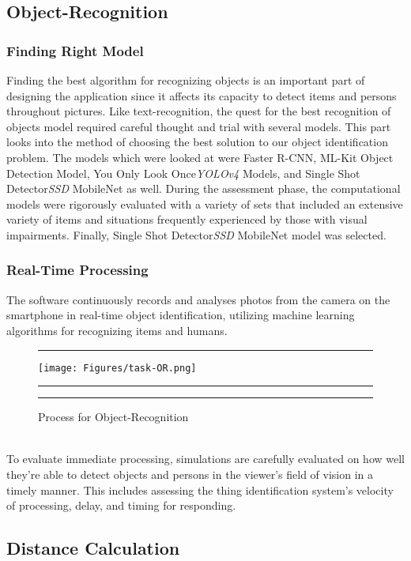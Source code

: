 \documentclass[MScCS]{uccthesis}
\begin{document}
\subsection{Object-Recognition}
\subsubsection{Finding Right Model}
Finding the best algorithm for recognizing objects is an important part of designing the application since it affects its capacity to detect items and persons throughout pictures. Like text-recognition, the quest for the best recognition of objects model required careful thought and trial with several models. This part looks into the method of choosing the best solution to our object identification problem. The models which were looked at were Faster R-CNN, ML-Kit Object Detection Model, You Only Look Once\textit{YOLOv4} Models, and Single Shot Detector\textit{SSD} MobileNet as well. During the assessment phase, the computational models were rigorously evaluated with a variety of sets that included an extensive variety of items and situations frequently experienced by those with visual impairments. Finally, Single Shot Detector\textit{SSD} MobileNet model was selected.
\subsubsection{Real-Time Processing}
The software continuously records and analyses photos from the camera on the smartphone in real-time object identification, utilizing machine learning algorithms for recognizing items and humans. 
\begin{figure}[hbtp]
      \hrule
      \vspace{0.5em}
     \centering
      \texttt{[image: Figures/task-OR.png]}
      \vspace{0.5em}
      \hrule
      \caption{\label{fig:task-TR}Process for Object-Recognition }
      \vspace{0.5em}
      \hrule
   \end{figure}
   \\
To evaluate immediate processing, simulations are carefully evaluated on how well they're able to detect objects and persons in the viewer's field of vision in a timely manner. This includes assessing the thing identification system's velocity of processing, delay, and timing for responding. 

\subsection{Distance Calculation}
\end{document}

